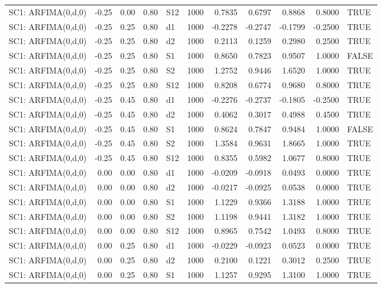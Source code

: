 \begin{table}[ht]
\begin{tabular}{lrrrlrrrrrl}
  SC1: ARFIMA(0,d,0) & -0.25 & 0.00 & 0.80 & S12 & 1000 & 0.7835 & 0.6797 & 0.8868 & 0.8000 & TRUE \\ 
  SC1: ARFIMA(0,d,0) & -0.25 & 0.25 & 0.80 & d1 & 1000 & -0.2278 & -0.2747 & -0.1799 & -0.2500 & TRUE \\ 
  SC1: ARFIMA(0,d,0) & -0.25 & 0.25 & 0.80 & d2 & 1000 & 0.2113 & 0.1259 & 0.2980 & 0.2500 & TRUE \\ 
  SC1: ARFIMA(0,d,0) & -0.25 & 0.25 & 0.80 & S1 & 1000 & 0.8650 & 0.7823 & 0.9507 & 1.0000 & FALSE \\ 
  SC1: ARFIMA(0,d,0) & -0.25 & 0.25 & 0.80 & S2 & 1000 & 1.2752 & 0.9446 & 1.6520 & 1.0000 & TRUE \\ 
  SC1: ARFIMA(0,d,0) & -0.25 & 0.25 & 0.80 & S12 & 1000 & 0.8208 & 0.6774 & 0.9680 & 0.8000 & TRUE \\ 
  SC1: ARFIMA(0,d,0) & -0.25 & 0.45 & 0.80 & d1 & 1000 & -0.2276 & -0.2737 & -0.1805 & -0.2500 & TRUE \\ 
  SC1: ARFIMA(0,d,0) & -0.25 & 0.45 & 0.80 & d2 & 1000 & 0.4062 & 0.3017 & 0.4988 & 0.4500 & TRUE \\ 
  SC1: ARFIMA(0,d,0) & -0.25 & 0.45 & 0.80 & S1 & 1000 & 0.8624 & 0.7847 & 0.9484 & 1.0000 & FALSE \\ 
  SC1: ARFIMA(0,d,0) & -0.25 & 0.45 & 0.80 & S2 & 1000 & 1.3584 & 0.9631 & 1.8665 & 1.0000 & TRUE \\ 
  SC1: ARFIMA(0,d,0) & -0.25 & 0.45 & 0.80 & S12 & 1000 & 0.8355 & 0.5982 & 1.0677 & 0.8000 & TRUE \\ 
  SC1: ARFIMA(0,d,0) & 0.00 & 0.00 & 0.80 & d1 & 1000 & -0.0209 & -0.0918 & 0.0493 & 0.0000 & TRUE \\ 
  SC1: ARFIMA(0,d,0) & 0.00 & 0.00 & 0.80 & d2 & 1000 & -0.0217 & -0.0925 & 0.0538 & 0.0000 & TRUE \\ 
  SC1: ARFIMA(0,d,0) & 0.00 & 0.00 & 0.80 & S1 & 1000 & 1.1229 & 0.9366 & 1.3188 & 1.0000 & TRUE \\ 
  SC1: ARFIMA(0,d,0) & 0.00 & 0.00 & 0.80 & S2 & 1000 & 1.1198 & 0.9441 & 1.3182 & 1.0000 & TRUE \\ 
  SC1: ARFIMA(0,d,0) & 0.00 & 0.00 & 0.80 & S12 & 1000 & 0.8965 & 0.7542 & 1.0493 & 0.8000 & TRUE \\ 
  SC1: ARFIMA(0,d,0) & 0.00 & 0.25 & 0.80 & d1 & 1000 & -0.0229 & -0.0923 & 0.0523 & 0.0000 & TRUE \\ 
  SC1: ARFIMA(0,d,0) & 0.00 & 0.25 & 0.80 & d2 & 1000 & 0.2100 & 0.1221 & 0.3012 & 0.2500 & TRUE \\ 
  SC1: ARFIMA(0,d,0) & 0.00 & 0.25 & 0.80 & S1 & 1000 & 1.1257 & 0.9295 & 1.3100 & 1.0000 & TRUE \\ 

\end{tabular}
\end{table}
